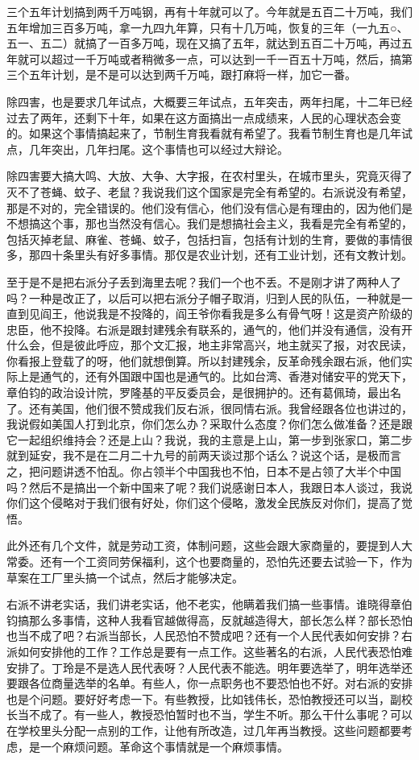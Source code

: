 三个五年计划搞到两千万吨钢，再有十年就可以了。今年就是五百二十万吨，我们五年增加三百多万吨，拿一九四九年算，只有十几万吨，恢复的三年（一九五○、五一、五二）就搞了一百多万吨，现在又搞了五年，就达到五百二十万吨，再过五年就可以超过一千万吨或者稍微多一点，可以达到一千一百五十万吨，然后，搞第三个五年计划，是不是可以达到两千万吨，跟打麻将一样，加它一番。

除四害，也是要求几年试点，大概要三年试点，五年突击，两年扫尾，十二年已经过去了两年，还剩下十年，如果在这方面搞出一点成绩来，人民的心理状态会变的。如果这个事情搞起来了，节制生育我看就有希望了。我看节制生育也是几年试点，几年突出，几年扫尾。这个事情也可以经过大辩论。

除四害要大搞大鸣、大放、大争、大字报，在农村里头，在城市里头，究竟灭得了灭不了苍蝇、蚊子、老鼠？我说我们这个国家是完全有希望的。右派说没有希望，那是不对的，完全错误的。他们没有信心，他们没有信心是有理由的，因为他们是不想搞这个事，那也当然没有信心。我们是想搞社会主义，我看是完全有希望的，包括灭掉老鼠、麻雀、苍蝇、蚊子，包括扫盲，包括有计划的生育，要做的事情很多，那四十条里头有好多事情。那仅是农业计划，还有工业计划，还有文教计划。

至于是不是把右派分子丢到海里去呢？我们一个也不丢。不是刚才讲了两种人了吗？一种是改正了，以后可以把右派分子帽子取消，归到人民的队伍，一种就是一直到见阎王，他说我是不投降的，阎王爷你看我是多么有骨气呀！这是资产阶级的忠臣，他不投降。右派是跟封建残余有联系的，通气的，他们并没有通信，没有开什么会，但是彼此呼应，那个文汇报，地主非常高兴，地主就买了报，对农民读，你看报上登载了的呀，他们就想倒算。所以封建残余，反革命残余跟右派，他们实际上是通气的，还有外国跟中国也是通气的。比如台湾、香港对储安平的党天下，章伯钧的政治设计院，罗隆基的平反委员会，是很拥护的。还有葛佩琦，最出名了。还有美国，他们很不赞成我们反右派，很同情右派。我曾经跟各位也讲过的，我说假如美国人打到北京，你们怎么办？采取什么态度？你们怎么做准备？还是跟它一起组织维持会？还是上山？我说，我的主意是上山，第一步到张家口，第二步就到延安，我不是在二月二十九号的前两天谈过那个话么？说这个话，是极而言之，把问题讲透不怕乱。你占领半个中国我也不怕，日本不是占领了大半个中国吗？然后不是搞出一个新中国来了呢？我们说感谢日本人，我跟日本人谈过，我说你们这个侵略对于我们很有好处，你们这个侵略，激发全民族反对你们，提高了觉悟。

此外还有几个文件，就是劳动工资，体制问题，这些会跟大家商量的，要提到人大常委。还有一个工资同劳保福利，这个也要商量的，恐怕先还要去试验一下，作为草案在工厂里头搞一个试点，然后才能够决定。

右派不讲老实话，我们讲老实话，他不老实，他瞒着我们搞一些事情。谁晓得章伯钧搞那么多事情，这种人我看官越做得高，反就越造得大，部长怎么样？部长恐怕也当不成了吧？右派当部长，人民恐怕不赞成吧？还有一个人民代表如何安排？右派如何安排他的工作？工作总是要有一点工作。这些著名的右派，人民代表恐怕难安排了。丁玲是不是选人民代表呀？人民代表不能选。明年要选举了，明年选举还要跟各位商量选举的名单。有些人，你一点职务也不要恐怕也不好。对右派的安排也是个问题。要好好考虑一下。有些教授，比如钱伟长，恐怕教授还可以当，副校长当不成了。有一些人，教授恐怕暂时也不当，学生不听。那么干什么事呢？可以在学校里头分配一点别的工作，让他有所改造，过几年再当教授。这些问题都要考虑，是一个麻烦问题。革命这个事情就是一个麻烦事情。

